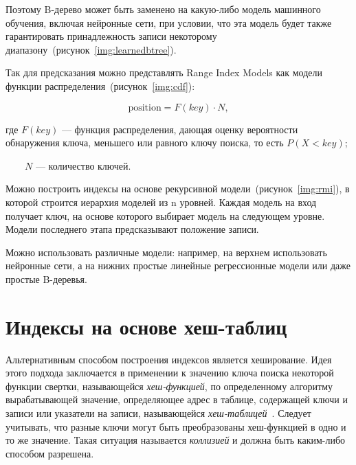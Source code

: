 
Поэтому B-дерево может быть заменено на какую-либо модель машинного обучения,
включая нейронные сети, при условии, что эта модель будет также гарантировать
принадлежность записи некоторому диапазону~(рисунок~\ref{img:learnedbtree}).


Так для предсказания можно представлять Range Index Models как модели функции
распределения~(рисунок~\ref{img:cdf}):

\begin{equation}
    \text{position} = F(key) \cdot N,
\end{equation}

где $F(key)$ --- функция распределения, дающая оценку вероятности обнаружения
ключа, меньшего или равного ключу поиска, то есть $P(X < key)$;

~~~~$N$ --- количество ключей.


Можно построить индексы на основе рекурсивной
модели~(рисунок~\ref{img:rmi}), в которой строится иерархия моделей из n
уровней. Каждая модель на вход получает ключ, на основе которого выбирает модель
на следующем уровне. Модели последнего этапа предсказывают положение записи.


Можно использовать различные модели: например, на верхнем использовать нейронные
сети, а на нижних простые линейные регрессионные модели или даже простые
B-деревья.

\section{Индексы на основе хеш-таблиц}

Альтернативным способом построения индексов является хеширование. Идея этого
подхода заключается в применении к значению ключа поиска некоторой функции
свертки, называющейся \textit{хеш-функцией}, по определенному алгоритму вырабатывающей
значение, определяющее адрес в таблице, содержащей ключи и записи или указатели
на записи, называющейся \textit{хеш-таблицей}~\cite{osip}. Следует учитывать,
что разные ключи могут быть преобразованы хеш-функцией в одно и то же значение.
Такая ситуация называется \textit{коллизией} и должна быть каким-либо способом
разрешена.


